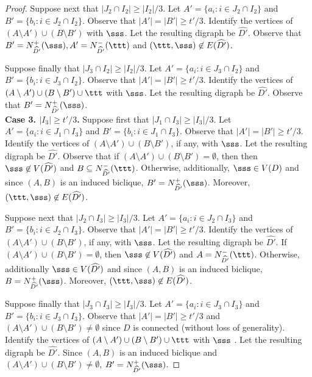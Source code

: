 \begin{proof}
Suppose next that $|J_2 \cap I_2| \geq |I_2|/3$. Let $A' =\{a_i: i \in J_2 \cap I_2\}$ and $B' =\{b_i:  i \in J_2 \cap I_2\}$. Observe that $|A'|=|B'| \geq t'/3$.
Identify the vertices of $(A\setminus A') \cup (B \setminus B')$ with $\sss$. Let the resulting digraph be  $\widehat{D'}$. Observe that  $B' = N^+_{\widehat{D'}}(\sss), A' = N^-_{\widehat{D'}}(\ttt)$ and $(\ttt,\sss) \not \in E(\widehat{D'})$.

Suppose finally that $|J_3 \cap I_2| \geq |I_2|/3$. Let $A' =\{a_i:  i \in J_3 \cap I_2\}$ and $B' =\{b_i:  i \in J_3 \cap I_2\}$. Observe that $|A'|=|B'| \geq t'/3$.
Identify the vertices of $(A\setminus A') \cup (B \setminus B') \cup \ttt$ with $\sss$. Let the resulting digraph be $\widehat{D'}$. Observe that $B' = N^+_{\widehat{D'}}(\sss)$. \\

\noindent
{\bf Case 3. $|I_3| \geq t'/3$.} Suppose first that $|J_1 \cap I_3| \geq |I_3|/3$. Let $A' =\{a_i:  i \in J_1 \cap I_3\}$ and $B' =\{b_i:  i \in J_1 \cap I_3\}$. Observe that $|A'|=|B'| \geq t'/3$.
Identify the vertices of $(A\setminus A') \cup (B \setminus B')$, if any, with $\sss$. Let the resulting digraph be  $\widehat{D'}$. Observe that if $(A\setminus A') \cup (B \setminus B') =\emptyset$, then then $\sss \not \in V(\widehat{D'})$ and $B \subseteq N^-_{\widehat{D'}}(\ttt)$. Otherwise, additionally, $\sss \in V(D)$ and since $(A,B)$ is an induced biclique, $B'=N^+_{\widehat{D'}}(\sss)$. Moreover, $(\ttt,\sss) \not \in E(\widehat{D'})$.

Suppose next that $|J_2 \cap I_3| \geq |I_3|/3$. Let $A' =\{a_i:  i \in J_2 \cap I_3\}$ and $B' =\{b_i:  i \in J_2 \cap I_3\}$. Observe that $|A'|=|B'| \geq t'/3$.
Identify the vertices of $(A\setminus A') \cup (B \setminus B')$, if any,  with $\sss$. Let the resulting digraph be  $\widehat{D'}$. If $(A\setminus A') \cup (B \setminus B') =\emptyset$, then $\sss \not \in V(\widehat{D'})$ and $A = N^-_{\widehat{D'}}(\ttt)$. Otherwise, additionally $\sss \in V(\widehat{D'})$ and since $(A,B)$ is an induced biclique, $B= N^+_{\widehat{D'}}(\sss)$. Moreover, $(\ttt,\sss) \not \in E(\widehat{D'})$.
  
Suppose finally that $|J_3 \cap I_3| \geq |I_3|/3$. Let $A' =\{a_i: i \in J_3 \cap I_3\}$ and $B' =\{b_i: i \in J_3 \cap I_3\}$. Observe that $|A'|=|B'| \geq t'/3$ and $(A\setminus A') \cup (B \setminus B') \neq \emptyset$ since $D$ is connected (without loss of generality).
Identify the vertices of $(A\setminus A') \cup (B \setminus B') \cup \ttt$ with $\sss$ . Let the resulting digraph be $\widehat{D'}$. Since $(A,B)$ is an induced biclique and $(A\setminus A') \cup (B \setminus B') \neq \emptyset$, 
 $B' = N^+_{\widehat{D'}}(\sss)$. 
\end{proof}
